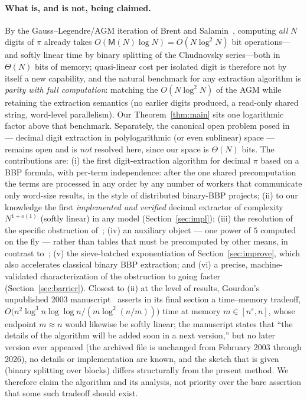 \documentclass[11pt]{article}
\theoremstyle{remark}
\theoremstyle{definition}
\begin{document}
\paragraph{What is, and is not, being claimed.}
By the Gauss--Legendre/AGM iteration of Brent and
Salamin~\cite{Brent76,Salamin76}, computing \emph{all} $N$ digits of $\pi$
already takes $O(\mathsf{M}(N)\log N)=O(N\log^{2}N)$ bit operations---and
softly linear time by binary splitting of the Chudnovsky series---both in
$\Theta(N)$ bits of memory; quasi-linear cost per isolated digit is therefore
not by itself a new capability, and the natural benchmark for any extraction
algorithm is \emph{parity with full computation}: matching the
$O(N\log^{2}N)$ of the AGM while retaining the extraction semantics (no
earlier digits produced, a read-only shared string, word-level parallelism).
Our Theorem~\ref{thm:main} sits one logarithmic factor above that benchmark.
Separately, the canonical open
problem posed in~\cite{BBP97} --- decimal digit extraction in polylogarithmic
(or even sublinear) space --- remains open and is \emph{not} resolved here,
since our space is $\Theta(N)$ bits. The contributions are:
(i) the first digit-extraction algorithm for decimal $\pi$ based on a BBP
formula, with per-term independence: after the one shared precomputation the
terms are processed in any order by any number of workers that communicate
only word-size results, in the style of distributed binary-BBP projects;
(ii) to our knowledge the first \emph{implemented and verified} decimal
extractor of complexity $N^{1+o(1)}$ (softly linear) in any model
(Section~\ref{sec:impl});
(iii) the resolution of the specific obstruction of~\cite{Zudilin24};
(iv) an auxiliary object --- one power of $5$ computed on the fly --- rather
than tables that must be precomputed by other means, in contrast
to~\cite{Plouffe22};
(v) the sieve-batched exponentiation of Section~\ref{sec:improve}, which
also accelerates classical binary BBP extraction; and
(vi) a precise, machine-validated characterization of the obstruction to
going faster (Section~\ref{sec:barrier}).
Closest to (ii) at the level of results, Gourdon's unpublished 2003
manuscript~\cite{Gourdon03} asserts in its final section a time--memory
tradeoff, $O\!\bigl(n^{2}\log^{3}n\log\log n/(m\log^{2}(n/m))\bigr)$ time at
memory $m\in[n^{\varepsilon},n]$, whose endpoint $m\approx n$ would likewise
be softly linear; the manuscript states that ``the details of the algorithm
will be added soon in a next version,'' but no later version ever appeared
(the archived file is unchanged from February 2003 through 2026), no details
or implementation are known, and the sketch that is given (binary splitting
over blocks) differs structurally from the present method. We therefore claim
the algorithm and its analysis, not priority over the bare assertion that
some such tradeoff should exist.
\end{document}
